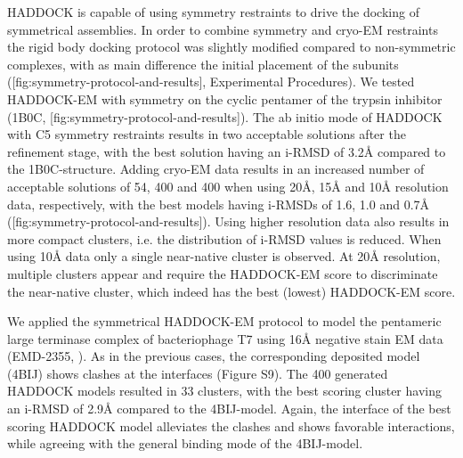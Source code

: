 
{}

HADDOCK is capable of using symmetry restraints to drive the docking of
symmetrical assemblies.  In order to combine symmetry and cryo-EM restraints
the rigid body docking protocol was slightly modified compared to non-symmetric
complexes, with as main difference the initial placement of the subunits
([fig:symmetry-protocol-and-results], Experimental Procedures).
We tested HADDOCK-EM with symmetry on the cyclic pentamer of the trypsin
inhibitor (1B0C, [fig:symmetry-protocol-and-results]).  The ab
initio mode of HADDOCK with C5 symmetry restraints results in two acceptable
solutions after the refinement stage, with the best solution having an i-RMSD
of 3.2Å compared to the 1B0C-structure.  Adding cryo-EM data results in an
increased number of acceptable solutions of 54, 400 and 400 when using 20Å, 15Å
and 10Å resolution data, respectively, with the best models having i-RMSDs of
1.6, 1.0 and 0.7Å ([fig:symmetry-protocol-and-results]).  Using
higher resolution data also results in more compact clusters, i.e. the
distribution of i-RMSD values is reduced.  When using 10Å data only a single
near-native cluster is observed. At 20Å resolution, multiple clusters appear
and require the HADDOCK-EM score to discriminate the near-native cluster, which
indeed has the best (lowest) HADDOCK-EM score. 

We applied the symmetrical HADDOCK-EM protocol to model the pentameric large
terminase complex of bacteriophage T7 using 16Å negative stain EM data
(EMD-2355, \citeauthor{Dauden2013}).  As in the previous cases, the
corresponding deposited model (4BIJ) shows clashes at the interfaces (Figure
S9).  The 400 generated HADDOCK models resulted in 33 clusters, with the best
scoring cluster having an i-RMSD of 2.9Å compared to the 4BIJ-model.  Again,
the interface of the best scoring HADDOCK model alleviates the clashes and
shows favorable interactions, while agreeing with the general binding mode of
the 4BIJ-model.
